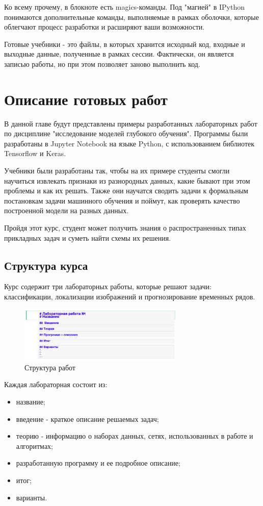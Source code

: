 Ко всему прочему, в блокноте есть magics-команды. Под "магией" в IPython понимаются дополнительные команды, выполняемые в рамках оболочки, которые облегчают процесс разработки и расширяют ваши возможности.

Готовые учебники - это файлы, в которых хранится исходный код, входные и выходные данные, полученные в рамках сессии. Фактически, он является записью работы, но при этом позволяет заново выполнить код. 

\section{Описание готовых работ}
В данной главе будут представлены примеры разработанных лабораторных работ  по дисциплине "исследование моделей глубокого обучения". Программы были разработаны в Jupyter Notebook на языке Python, с использованием библиотек Tensorflow и Keras.

Учебники были разработаны так, чтобы на их примере студенты смогли научиться извлекать признаки из разнородных данных, какие бывают при этом проблемы и как их решать. Также они научатся сводить задачи к формальным постановкам задачи машинного обучения и поймут, как проверять качество построенной модели на разных данных.

Пройдя этот курс, студент может получить знания о распространенных типах прикладных задач и  суметь найти схемы их решения.
 
\subsection{Структура курса}

Курс содержит три лабораторных работы, которые решают задачи: классификации, локализации изображений и прогнозирование временных рядов. 


\begin{figure}[htbp]
	\centering
	\includegraphics[width=0.7\textwidth]{fig/struct}
	\caption{Структура работ }%
	\label{fig:struct}
\end{figure}

Каждая лабораторная состоит из:
\begin{itemize}
\item название;
\item введение - краткое описание решаемых задач;
\item теорию - информацию о наборах данных, сетях, использованных в работе и алгоритмах;
\item разработанную программу и ее подробное описание;
\item итог;
\item варианты.
\end{itemize}

